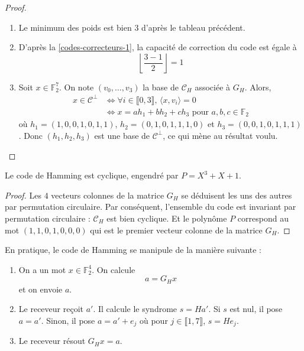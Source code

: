   \begin{proof}
    \begin{enumerate}[label={\bfseries(\roman*)}]
      \item Le minimum des poids est bien $3$ d'après le tableau précédent.
      \item D'après la \cref{codes-correcteurs-1}, la capacité de correction du code est égale à
      \[ \left\lfloor \frac{3-1}{2} \right\rfloor = 1 \]
      \item Soit $x \in \mathbb{F}_2^7$. On note $(v_0, \dots, v_3)$ la base de $\mathcal{C}_H$ associée à $G_H$. Alors,
      \begin{align*}
        x \in \mathcal{C}^\perp &\iff \forall i \in \llbracket 0, 3 \rrbracket, \, \langle x, v_i \rangle = 0 \\
        &\iff x = ah_1 + bh_2 + ch_3 \text{ pour } a,b,c \in \mathbb{F}_2
      \end{align*}
      où $h_1 = (1,  0,  0,  1,  0,  1,  1)$, $h_2 = (0,  1,  0,  1,  1,  1,  0)$ et $h_3 = (0,  0,  1,  0,  1,  1,  1)$. Donc $(h_1, h_2, h_3)$ est une base de $\mathcal{C}^\perp$, ce qui mène au résultat voulu.
    \end{enumerate}
  \end{proof}

  \begin{proposition}
    Le code de Hamming est cyclique, engendré par $P = X^3 + X + 1$.
  \end{proposition}

  \begin{proof}
    Les $4$ vecteurs colonnes de la matrice $G_H$ se déduisent les uns des autres par permutation circulaire. Par conséquent, l'ensemble du code est invariant par permutation circulaire : $\mathcal{C}_H$ est bien cyclique. Et le polynôme $P$ correspond au mot $(1, 1, 0, 1, 0, 0, 0)$ qui est le premier vecteur colonne de la matrice $G_H$.
  \end{proof}

  En pratique, le code de Hamming se manipule de la manière suivante :

  \begin{enumerate}
    \item On a un mot $x \in \mathbb{F}_2^4$. On calcule
    \[ a = G_H x \]
    et on envoie $a$.
    \item Le receveur reçoit $a'$. Il calcule le syndrome $s = Ha'$. Si $s$ est nul, il pose $a = a'$. Sinon, il pose $a = a' + e_j$ où pour $j \in \llbracket 1, 7 \rrbracket$, $s = He_j$.
    \item Le receveur résout $G_H x = a$.
  \end{enumerate}

